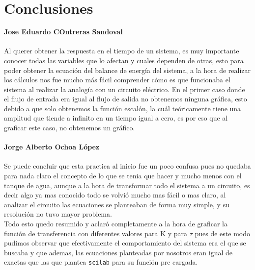 \documentclass[letterpaper,10pt]{article}
\begin{document}
\section*{Conclusiones}
\textbf{Jose Eduardo COntreras Sandoval}\\\\
Al querer obtener la respuesta en el tiempo de un sistema, es muy importante conocer todas las variables que lo
afectan y cuales dependen de otras, esto para poder obtener la ecuación del balance de energía del sistema, a la 
hora de realizar los cálculos nos fue mucho más fácil comprender cómo es que funcionaba el sistema al realizar la
analogía con un circuito eléctrico. En el primer caso donde el flujo de entrada era igual al flujo de salida
no obtenemos ninguna gráfica, esto debido a que solo obtenemos la función escalón, la cuál teóricamente tiene una 
amplitud que tiende a infinito en un tiempo igual a cero, es por eso que al graficar este caso, no obtenemos un gráfico.\\ \\
\textbf{Jorge Alberto Ochoa López}\\\\
Se puede concluir que esta practica al inicio fue un poco confusa pues no quedaba para nada claro el concepto de lo que se tenia que hacer y mucho menos con el tanque de agua, aunque a la hora de transformar todo el sistema a un circuito, es decir algo ya mas conocido todo se volvió mucho mas fácil o mas claro, al analizar el circuito las ecuaciones se planteaban de forma muy simple, y su resolución no tuvo mayor problema.\\
Todo esto quedo resumido y aclaró completamente a la hora de graficar la función de transferencia con diferentes valores para K y para $\tau$ pues de este modo pudimos observar que efectivamente el comportamiento del sistema era el que se buscaba y que ademas, las ecuaciones planteadas por nosotros eran igual de exactas que las que plantea \texttt{scilab} para su función pre cargada.
\end{document}
